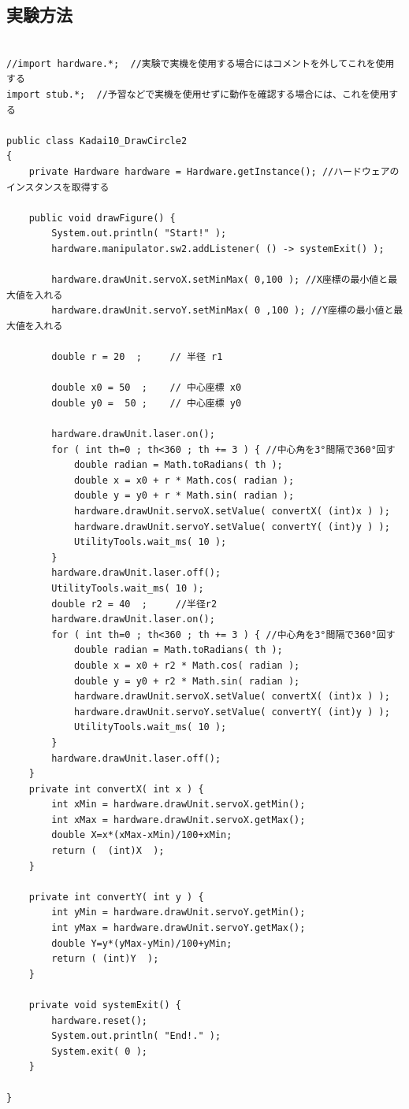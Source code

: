 \documentclass{jarticle}
\begin{document}
\subsection{実験方法}
\begin{lstlisting}[caption=DrawCircle]

//import hardware.*;  //実験で実機を使用する場合にはコメントを外してこれを使用する
import stub.*;  //予習などで実機を使用せずに動作を確認する場合には、これを使用する

public class Kadai10_DrawCircle2
{
    private Hardware hardware = Hardware.getInstance(); //ハードウェアのインスタンスを取得する

    public void drawFigure() {
        System.out.println( "Start!" );
        hardware.manipulator.sw2.addListener( () -> systemExit() );

        hardware.drawUnit.servoX.setMinMax( 0,100 ); //X座標の最小値と最大値を入れる
        hardware.drawUnit.servoY.setMinMax( 0 ,100 ); //Y座標の最小値と最大値を入れる

        double r = 20  ;     // 半径 r1

        double x0 = 50  ;    // 中心座標 x0
        double y0 =  50 ;    // 中心座標 y0
        
        hardware.drawUnit.laser.on();
        for ( int th=0 ; th<360 ; th += 3 ) { //中心角を3°間隔で360°回す
            double radian = Math.toRadians( th );
            double x = x0 + r * Math.cos( radian );
            double y = y0 + r * Math.sin( radian );
            hardware.drawUnit.servoX.setValue( convertX( (int)x ) );
            hardware.drawUnit.servoY.setValue( convertY( (int)y ) );
            UtilityTools.wait_ms( 10 );
        }
        hardware.drawUnit.laser.off();
        UtilityTools.wait_ms( 10 );
        double r2 = 40  ;     //半径r2
        hardware.drawUnit.laser.on();
        for ( int th=0 ; th<360 ; th += 3 ) { //中心角を3°間隔で360°回す
            double radian = Math.toRadians( th );
            double x = x0 + r2 * Math.cos( radian );
            double y = y0 + r2 * Math.sin( radian );
            hardware.drawUnit.servoX.setValue( convertX( (int)x ) );
            hardware.drawUnit.servoY.setValue( convertY( (int)y ) );
            UtilityTools.wait_ms( 10 );
        }
        hardware.drawUnit.laser.off();
    }
    private int convertX( int x ) {
        int xMin = hardware.drawUnit.servoX.getMin();
        int xMax = hardware.drawUnit.servoX.getMax();
        double X=x*(xMax-xMin)/100+xMin;
        return (  (int)X  );  
    }

    private int convertY( int y ) {
        int yMin = hardware.drawUnit.servoY.getMin();
        int yMax = hardware.drawUnit.servoY.getMax();
        double Y=y*(yMax-yMin)/100+yMin;
        return ( (int)Y  );  
    }

    private void systemExit() {
        hardware.reset();
        System.out.println( "End!." );
        System.exit( 0 );
    }

}

\end{lstlisting}
\end{document}
